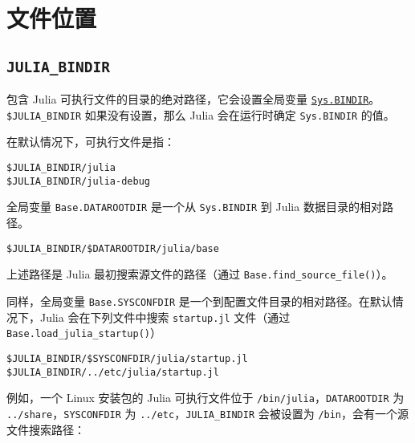 \hypertarget{10129404461588265763}{}


\section{文件位置}



\hypertarget{11878722049876551255}{}


\subsection{\texttt{JULIA\_BINDIR}}



包含 Julia 可执行文件的目录的绝对路径，它会设置全局变量 \hyperlink{11034333937761980027}{\texttt{Sys.BINDIR}}。\texttt{\$JULIA\_BINDIR} 如果没有设置，那么 Julia 会在运行时确定 \texttt{Sys.BINDIR} 的值。



在默认情况下，可执行文件是指：




\begin{lstlisting}
$JULIA_BINDIR/julia
$JULIA_BINDIR/julia-debug
\end{lstlisting}



全局变量 \texttt{Base.DATAROOTDIR} 是一个从 \texttt{Sys.BINDIR} 到 Julia 数据目录的相对路径。




\begin{lstlisting}
$JULIA_BINDIR/$DATAROOTDIR/julia/base
\end{lstlisting}



上述路径是 Julia 最初搜索源文件的路径（通过 \texttt{Base.find\_source\_file()}）。



同样，全局变量 \texttt{Base.SYSCONFDIR} 是一个到配置文件目录的相对路径。在默认情况下，Julia 会在下列文件中搜索 \texttt{startup.jl} 文件（通过 \texttt{Base.load\_julia\_startup()}）




\begin{lstlisting}
$JULIA_BINDIR/$SYSCONFDIR/julia/startup.jl
$JULIA_BINDIR/../etc/julia/startup.jl
\end{lstlisting}



例如，一个 Linux 安装包的 Julia 可执行文件位于 \texttt{/bin/julia}，\texttt{DATAROOTDIR} 为 \texttt{../share}，\texttt{SYSCONFDIR} 为 \texttt{../etc}，\texttt{JULIA\_BINDIR} 会被设置为 \texttt{/bin}，会有一个源文件搜索路径：




